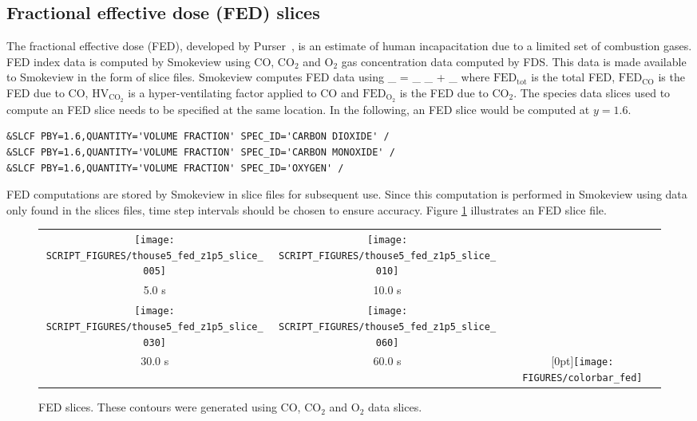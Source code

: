 \documentclass[11pt,twoside]{book}
\begin{document}
\subsection{Fractional effective dose (FED) slices}
The fractional effective dose (FED), developed by Purser~\cite{SFPE:Purser},
is an estimate of human incapacitation
due to a limited set of combustion gases.
FED index data is computed by Smokeview using CO, $\mathrm{CO_2}$ and $\mathrm{O_2}$ gas
concentration data computed by FDS.
This data is made available to Smokeview in the form of slice files.
Smokeview computes FED data using
\be
{}_ = _
\times {}_ + _
\ee
where $\mathrm{FED}_\mathrm{tot}$ is the total FED,
$\mathrm{FED}_\mathrm{CO}$ is the FED due to CO,
$\mathrm{HV}_\mathrm{CO_2}$ is a hyper-ventilating factor
applied to CO and $\mathrm{FED}_\mathrm{O_2}$
is the FED due to $\mathrm{CO_2}$.
The species data slices used to compute an FED slice needs to be specified at the
same location.  In the following, an FED slice would be computed at $y=1.6$.
\begin{lstlisting}
&SLCF PBY=1.6,QUANTITY='VOLUME FRACTION' SPEC_ID='CARBON DIOXIDE' /
&SLCF PBY=1.6,QUANTITY='VOLUME FRACTION' SPEC_ID='CARBON MONOXIDE' /
&SLCF PBY=1.6,QUANTITY='VOLUME FRACTION' SPEC_ID='OXYGEN' /
\end{lstlisting}

FED computations are stored by Smokeview in slice files for subsequent use.
Since this computation
is performed in Smokeview using data only found in the slices files, time step intervals
should be chosen to ensure accuracy.  Figure \ref{figfedslice} illustrates
an FED slice file.

\begin{figure}[\figoptions]
\begin{center}
\begin{tabular}{ccc}
\texttt{[image: SCRIPT\_FIGURES/thouse5\_fed\_z1p5\_slice\_005]}&
\texttt{[image: SCRIPT\_FIGURES/thouse5\_fed\_z1p5\_slice\_010]}\\
5.0 s&10.0 s\\
\texttt{[image: SCRIPT\_FIGURES/thouse5\_fed\_z1p5\_slice\_030]}&
\texttt{[image: SCRIPT\_FIGURES/thouse5\_fed\_z1p5\_slice\_060]}&\\
30.0 s&60.0 s
&\raisebox{0.0ex}[0pt]{\texttt{[image: FIGURES/colorbar\_fed]}}\\
\end{tabular}
\caption [FED slices.]
{FED slices.
These contours were generated using CO, $\mathrm{CO_2}$ and $\mathrm{O_2}$ data slices.
}
\label{figfedslice}%
\end{center}
\end{figure}
\end{document}
